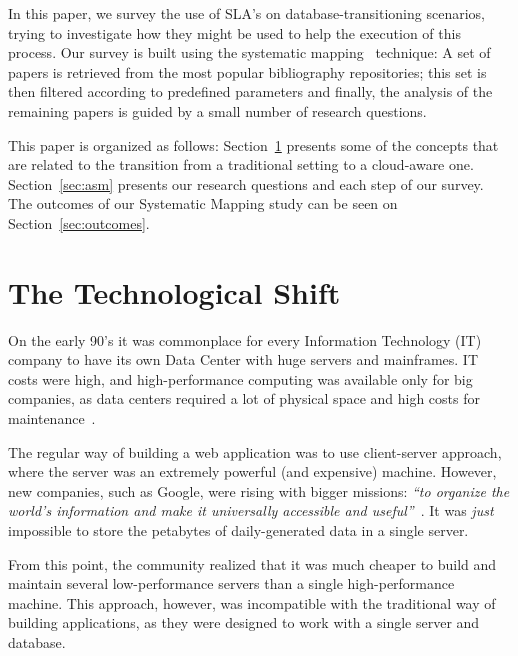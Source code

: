 \documentclass{article}
\begin{document}
In this paper, we survey the use of SLA's on database-transitioning scenarios, trying to investigate how they might be used to help the execution of this process.
Our survey is built using the systematic mapping~\cite{Petersen:2008:SMS:2227115.2227123} technique: A set of papers is retrieved from the most popular bibliography repositories; this set is then filtered according to predefined parameters and finally, the analysis of the remaining papers is guided by a small number of research questions.

\bigskip

This paper is organized as follows: 
Section~\ref{sec:tts} presents some of the concepts that are related to the transition from a traditional setting to a cloud-aware one.
Section~\ref{sec:asm} presents our research questions and each step of our survey. The outcomes of our Systematic Mapping study can be seen on Section~\ref{sec:outcomes}.

\section{The Technological Shift}
\label{sec:tts}


On the early 90's it was commonplace for every Information Technology (IT) company to have its own Data Center with huge servers and mainframes. 
IT costs were high, and high-performance computing was available only for big companies, as data centers required a lot of physical space and high costs for maintenance~\cite{Armbrust09m.:above}.

The regular way of building a web application was to use client-server approach, where the server was an extremely powerful (and expensive) machine. 
However, new companies, such as Google, were rising with bigger missions: \textit{``to organize the world's information and make it universally accessible and useful''}~\cite{Spector:2012:GHA:2209249.2209262}. 
It was \textit{just} impossible to store the petabytes of daily-generated data in a single server. 

From this point, the community realized that it was much cheaper to build and maintain several low-performance servers than a single high-performance machine.
This approach, however, was incompatible with the traditional way of building applications, as they were designed to work with a single server and database. 
\end{document}
